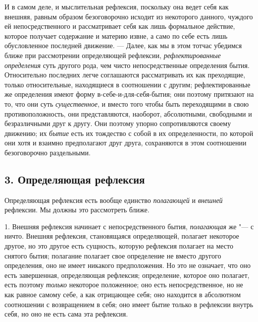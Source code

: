 И в самом деле, и мыслительная рефлексия, поскольку она ведет себя как
внешняя, равным образом безоговорочно исходит из некоторого данного,
чуждого ей непосредственного и рассматривает себя как лишь формальное
действие, которое получает содержание и материю извне, а само по себе есть
лишь обусловленное последней движение. --- Далее, как мы в этом тотчас
убедимся ближе при рассмотрении определяющей рефлексии,
{\em рефлектированные определения} суть другого рода,
чем чисто непосредственные определения бытия. Относительно последних легче
соглашаются рассматривать их как преходящие, только относительные,
находящиеся в соотношении с другим; рефлектированные же определения имеют
форму в-себе-и-для-себя-бытия; они поэтому притязают на то, что они суть
{\em существенное}, и вместо того чтобы быть
переходящими в свою противоположность, они представляются, наоборот,
абсолютными, свободными и безразличными друг к другу. Они поэтому упорно
сопротивляются своему движению; их {\em бытие} есть их
тождество с собой в их определенности, по которой они хотя и взаимно
предполагают друг друга, сохраняются в этом соотношении безоговорочно
раздельными.

\subsection[3. Определяющая рефлексия]{3. Определяющая рефлексия}
Определяющая рефлексия есть вообще единство
{\em полагающей} и {\em внешней}
рефлексии. Мы должны это рассмотреть ближе.

1. Внешняя рефлексия начинает с непосредственного бытия,
{\em полагающая} же "--- с ничто. Внешняя рефлексия,
становящаяся определяющей, полагает некоторое другое, но это другое есть
сущность, которую рефлексия полагает на место снятого бытия; полагание
полагает свое определение не вместо другого определения, оно не имеет
никакого предположения. Но это не означает, что оно есть завершенная,
определяющая рефлексия; определение, которое оно полагает, есть поэтому
{\em только} некоторое положенное; оно есть
непосредственное, но не как равное самому себе, а как отрицающее себя; оно
находится в абсолютном соотношении с возвращением в себя; оно имеет бытие
только в рефлексии внутрь себя, но оно не есть сама эта рефлексия.

